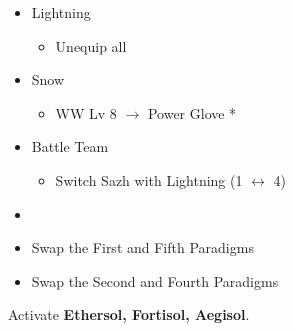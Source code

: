 \begin{multicols}{2}
\begin{menu}
\begin{itemize}
\begin{itemize}
\begin{itemize}
              \end{itemize}
      \end{itemize}
      \equip
      \begin{itemize}
        \item Lightning
              \begin{itemize}
                \item Unequip all
              \end{itemize}
        \item Snow
              \begin{itemize}
                \item WW Lv 8 $\rightarrow$ Power Glove *
              \end{itemize}
      \end{itemize}
      \paradigm
      \begin{itemize}
        \item Battle Team
              \begin{itemize}
                \item Switch Sazh with Lightning (1 $\leftrightarrow$ 4)
              \end{itemize}
        \item {}%
              {\paradigmline{\com}{\sen}{\med}}%
              {\paradigmline{(\rav)}{\rav}{\rav}}%
              {\paradigmline{(\rav)}{\sen}{(\rav)}}%
              {\paradigmline[4]{\textit{(\com)}}{\textit{\com}}{\textit{(\com)}}}%
              {\paradigmline{\rav}{\com}{(\com)}}%
              {\paradigmline{\rav}{\com}{(\rav)}}
        \item Swap the First and Fifth Paradigms
        \item Swap the Second and Fourth Paradigms
      \end{itemize}
    \end{itemize}
  \end{menu}
\end{multicols}
\newpage
Activate \textbf{Ethersol, Fortisol, Aegisol}.
\renewcommand{\first}{[1] Aggression (\rav/\com/\com)}
\renewcommand{\second}{[2] Cerberus (\com/\com/\com)}
\renewcommand{\third}{[3] Mystic Tower (\rav/\sen/\rav)}
\renewcommand{\fourth}{[4] Solidarity (\com/\sen/\med)}
\renewcommand{\fifth}{[5] Relentless Assault (\rav/\com/\rav)}
\renewcommand{\sixth}{[6] Tri-Disaster (\rav/\rav/\rav)}

